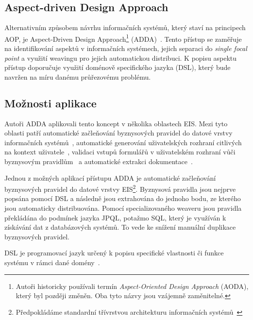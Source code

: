 \subsection{Aspect-driven Design Approach}\label{sec:adda}

Alternativním způsobem návrhu informačních systémů, který staví na principech \gls{AOP},
je Aspect-Driven Design Approach\footnote{Autoři historicky používali termín \textit{Aspect-Oriented
Design Approach} (AODA), který byl později změněn. Oba tyto názvy jsou vzájemně zaměnitelné.}
(\gls{ADDA})~\cite{cemus2014aspect}. Tento přístup se zaměřuje na identifikování aspektů v informačních systémech,
jejich separaci do \textit{single focal point} a využití weavingu pro jejich automatickou distribuci.
K popisu aspektu přístup doporučuje využití doménově specifického jazyka (\gls{DSL}), který bude navržen na
míru danému průřezovému problému.

\subsection{Možnosti aplikace}

Autoři \gls{ADDA} aplikovali tento koncept v několika oblastech \gls{EIS}.
Mezi tyto oblasti patří automatické začleňování byznysových pravidel
do datové vrstvy informačních systémů~\cite{cemus2015automated}, automatické
generování uživatelských rozhraní citlivých na kontext uživatele~\cite{cemus2017separation},
validaci vstupů formulářů v uživatelském rozhraní vůči byznysovým pravidlům~\cite{cemus2016context}\cite{cemus2017separation}
a automatické extrakci dokumentace~\cite{cemus2017automated}.

Jednou z možných aplikací přístupu \gls{ADDA} je automatické začleňování
byznysových pravidel do datové vrstvy \gls{EIS}\footnote{Předpokládáme standardní
třívrstvou architekturu informačních systémů~\cite{fowler2002patterns}}.
Byznysová pravidla jsou nejprve popsána pomocí \gls{DSL} a následně jsou
extrahována do jednoho bodu, ze kterého jsou automaticky distribuována.
Pomocí specializovaného weaveru jsou pravidla překládána do podmínek
jazyka \gls{JPQL}, potažmo \gls{SQL}, který je využíván k získávání dat
z databázových systémů. To vede ke snížení manuální duplikace byznysových
pravidel.

\begin{definition}
    \gls{DSL} je programovací jazyk určený k popisu specifické vlastnosti či funkce systému v
    rámci dané domény~\cite{fowler2010domain}.
\end{definition}

